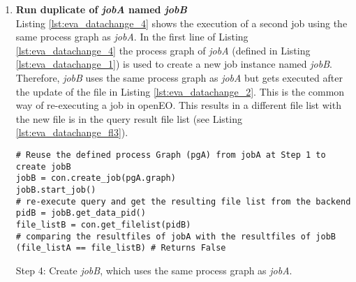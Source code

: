 \documentclass[draft,final]{vutinfth} %
\newenvironment{code}{\captionsetup{type=listing}}{}
\begin{document}
\begin{enumerate}
	\begin{code}
		\begin{verbatim}
# Get state of the resultfiles, so if they changed since 
# the original execution. 
file_listA = con.get_filelist(pidA)
file_listA["input_files"]["state"] # Returns "EQUAL"
		\end{verbatim}
		\caption{Re-execute \textit{pidA} query after one file got updated.}
		\label{lst:eva_datachange_3}
	\end{code}
	\newpage
	\begin{code}
		\begin{verbatim}
{'timestamp': '2017-05-08 00:00:00', 
'path': '/eodc/products/copernicus.eu/s2a_prd_msil1c/2017/05/04/
S2A_MSIL1C_20170504T101031_N0205_R022_T32TPR_20170504T101349.zip'}, 
{'timestamp': '2017-05-08 00:00:00',
'path':'/eodc/products/copernicus.eu/s2a_prd_msil1c/2017/05/04/
S2A_MSIL1C_20170504T101031_N0205_R022_T32TQS_20170504T101349.zip', 
{'timestamp': '2017-05-08 00:00:00', 
'path': '/eodc/products/copernicus.eu/s2a_prd_msil1c/2017/05/04/
S2A_MSIL1C_20170504T101031_N0205_R022_T32TQR_20170504T101349.zip'}, 
{'timestamp': '2017-05-08 00:00:00',
'path':'/eodc/products/copernicus.eu/s2a_prd_msil1c/2017/05/04/
S2A_MSIL1C_20170504T101031_N0205_R022_T32TPT_20170504T101349.zip'},
...
		\end{verbatim}
		\caption{First four resulting files of the file list.}
		\label{lst:eva_datachange_rf3}
	\end{code}

	\item \textbf{Run duplicate of \textit{jobA} named \textit{jobB}} \\
	Listing \ref{lst:eva_datachange_4} shows the execution of a second job using the same process graph as \textit{jobA}. In the first line of Listing \ref{lst:eva_datachange_4} the process graph of \textit{jobA} (defined in Listing \ref{lst:eva_datachange_1}) is used to create a new job instance named \textit{jobB}. Therefore, \textit{jobB} uses the same process graph as \textit{jobA} but gets executed after the update of the file in Listing \ref{lst:eva_datachange_2}. This is the common way of re-executing a job in openEO. This results in a different file list with the new file is in the query result file list (see Listing \ref{lst:eva_datachange_fl3}).
	\begin{code}
		\begin{verbatim}
# Reuse the defined process Graph (pgA) from jobA at Step 1 to create jobB
jobB = con.create_job(pgA.graph)
jobB.start_job()
# re-execute query and get the resulting file list from the backend
pidB = jobB.get_data_pid()
file_listB = con.get_filelist(pidB)
# comparing the resultfiles of jobA with the resultfiles of jobB
(file_listA == file_listB) # Returns False
		\end{verbatim}
		\caption{Step 4: Create \textit{jobB}, which uses the same process graph as \textit{jobA}.}
		\label{lst:eva_datachange_4}
	\end{code}
	

\end{enumerate}
\end{document}
